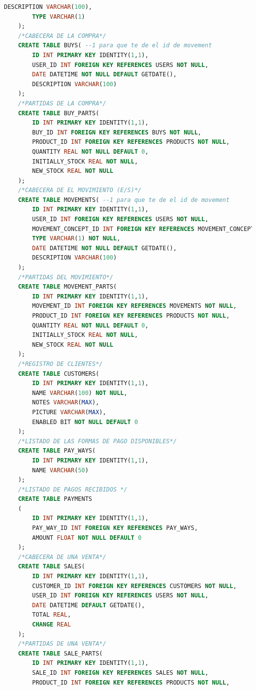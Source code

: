 \documentclass[a4paper,DIV=12]{scrreprt}
\begin{document}
\begin{lstlisting}[language={SQL}]
        DESCRIPTION VARCHAR(100),
        TYPE VARCHAR(1)
    );
    /*CABECERA DE LA COMPRA*/
    CREATE TABLE BUYS( --1 para que te de el id de movement
        ID INT PRIMARY KEY IDENTITY(1,1),
        USER_ID INT FOREIGN KEY REFERENCES USERS NOT NULL,
        DATE DATETIME NOT NULL DEFAULT GETDATE(),
        DESCRIPTION VARCHAR(100)
    );
    /*PARTIDAS DE LA COMPRA*/
    CREATE TABLE BUY_PARTS(  
        ID INT PRIMARY KEY IDENTITY(1,1),
        BUY_ID INT FOREIGN KEY REFERENCES BUYS NOT NULL,
        PRODUCT_ID INT FOREIGN KEY REFERENCES PRODUCTS NOT NULL,
        QUANTITY REAL NOT NULL DEFAULT 0,
        INITIALLY_STOCK REAL NOT NULL,
        NEW_STOCK REAL NOT NULL
    );
    /*CABECERA DE EL MOVIMIENTO (E/S)*/
    CREATE TABLE MOVEMENTS( --1 para que te de el id de movement
        ID INT PRIMARY KEY IDENTITY(1,1),
        USER_ID INT FOREIGN KEY REFERENCES USERS NOT NULL,
        MOVEMENT_CONCEPT_ID INT FOREIGN KEY REFERENCES MOVEMENT_CONCEPT NOT NULL,
        TYPE VARCHAR(1) NOT NULL,
        DATE DATETIME NOT NULL DEFAULT GETDATE(),
        DESCRIPTION VARCHAR(100)
    );
    /*PARTIDAS DEL MOVIMIENTO*/
    CREATE TABLE MOVEMENT_PARTS(  
        ID INT PRIMARY KEY IDENTITY(1,1),
        MOVEMENT_ID INT FOREIGN KEY REFERENCES MOVEMENTS NOT NULL,
        PRODUCT_ID INT FOREIGN KEY REFERENCES PRODUCTS NOT NULL,
        QUANTITY REAL NOT NULL DEFAULT 0,
        INITIALLY_STOCK REAL NOT NULL,
        NEW_STOCK REAL NOT NULL
    );
    /*REGISTRO DE CLIENTES*/
    CREATE TABLE CUSTOMERS(
        ID INT PRIMARY KEY IDENTITY(1,1),
        NAME VARCHAR(100) NOT NULL,
        NOTES VARCHAR(MAX),
        PICTURE VARCHAR(MAX),
        ENABLED BIT NOT NULL DEFAULT 0
    );
    /*LISTADO DE LAS FORMAS DE PAGO DISPONIBLES*/
    CREATE TABLE PAY_WAYS(	
        ID INT PRIMARY KEY IDENTITY(1,1),
        NAME VARCHAR(50)
    );
    /*LISTADO DE PAGOS RECIBIDOS */
    CREATE TABLE PAYMENTS
    (
        ID INT PRIMARY KEY IDENTITY(1,1),
        PAY_WAY_ID INT FOREIGN KEY REFERENCES PAY_WAYS,
        AMOUNT FLOAT NOT NULL DEFAULT 0
    );
    /*CABECERA DE UNA VENTA*/
    CREATE TABLE SALES(
        ID INT PRIMARY KEY IDENTITY(1,1),
        CUSTOMER_ID INT FOREIGN KEY REFERENCES CUSTOMERS NOT NULL,
        USER_ID INT FOREIGN KEY REFERENCES USERS NOT NULL,
        DATE DATETIME DEFAULT GETDATE(),
        TOTAL REAL,
        CHANGE REAL
    );
    /*PARTIDAS DE UNA VENTA*/
    CREATE TABLE SALE_PARTS(
        ID INT PRIMARY KEY IDENTITY(1,1),
        SALE_ID INT FOREIGN KEY REFERENCES SALES NOT NULL,
        PRODUCT_ID INT FOREIGN KEY REFERENCES PRODUCTS NOT NULL,

\end{lstlisting}
\end{document}
